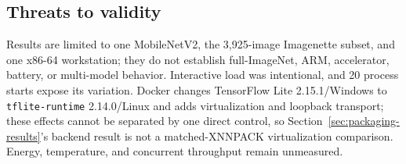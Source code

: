 \subsection{Threats to validity}

Results are limited to one MobileNetV2, the 3,925-image Imagenette subset, and one x86-64 workstation; they do not establish full-ImageNet, ARM, accelerator, battery, or multi-model behavior. Interactive load was intentional, and 20 process starts expose its variation. Docker changes TensorFlow Lite 2.15.1/Windows to \texttt{tflite-runtime} 2.14.0/Linux and adds virtualization and loopback transport; these effects cannot be separated by one direct control, so Section~\ref{sec:packaging-results}'s backend result is not a matched-XNNPACK virtualization comparison. Energy, temperature, and concurrent throughput remain unmeasured.
